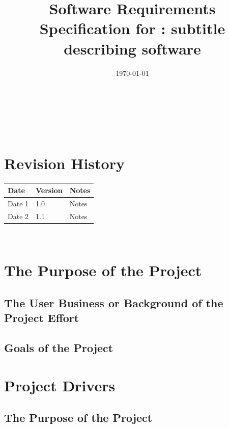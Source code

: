 \documentclass[12pt]{article}
\begin{document}
	
	\title{Software Requirements Specification for \progname: subtitle describing
		software} 
	\author{\authname}
	\date{\today}
	
	\maketitle
	
	~\newpage
	
	
	\tableofcontents
	
	~\newpage
	
	\section*{Revision History}
	
	\begin{tabularx}{\textwidth}{p{3cm}p{2cm}X}
		\toprule {\bf Date} & {\bf Version} & {\bf Notes}\\
		\midrule
		Date 1 & 1.0 & Notes\\
		Date 2 & 1.1 & Notes\\
		\bottomrule
	\end{tabularx}
	
	~\newpage
	
	
	\section{The Purpose of the Project}
	\subsection{The User Business or Background of the Project Effort}
	\subsection{Goals of the Project}
	
	
	\section{Project Drivers}
	\subsection{The Purpose of the Project}
\end{document}
